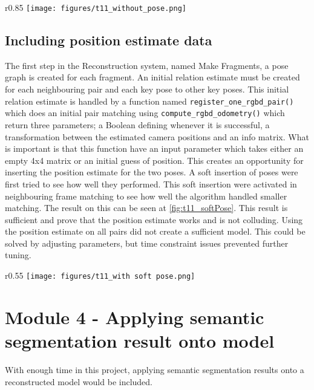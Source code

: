 \begin{wrapfigure}{r}{0.85\textwidth}
    \centering
    \texttt{[image: figures/t11\_without\_pose.png]}
    \caption{Result from t11 with data from D435i}
    \label{fig:t11_withoutPose}
\end{wrapfigure}
\subsection{Including position estimate data}
The first step in the Reconstruction system, named Make Fragments, a pose graph is created for each fragment. An initial relation estimate must be created for each neighbouring pair and each key pose to other key poses. This initial relation estimate is handled by a function named \texttt{register\_one\_rgbd\_pair()}  which does an initial pair matching using \texttt{compute\_rgbd\_odometry()} which return three parameters; a Boolean defining whenever it is successful,  a transformation between the estimated camera positions and an info matrix. What is important is that this function have an input parameter which takes either an empty 4x4 matrix or an initial guess of position. This creates an opportunity for inserting the position estimate for the two poses. A soft insertion of poses were first tried to see how well they performed. This soft insertion were activated in neighbouring frame matching to see how well the algorithm handled smaller matching. The result on this can be seen at \ref{fig:t11_softPose}. This result is sufficient and prove that the position estimate works and is not colluding. Using the position estimate on all pairs did not create a sufficient model. This could be solved by adjusting parameters, but time constraint issues prevented further tuning. 

\begin{wrapfigure}{r}{0.55\textwidth}
    \centering
    \texttt{[image: figures/t11\_with soft pose.png]}
    \caption{Result from t11 with data from D435i and T265 as soft insertion}
    \label{fig:t11_softPose}
\end{wrapfigure}





\section{Module 4 - Applying semantic segmentation result onto model}


With enough time in this project, applying semantic segmentation results onto a reconstructed model would be included. 

